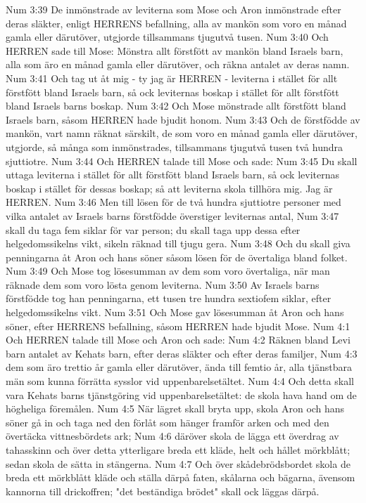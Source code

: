 Num 3:39  De inmönstrade av leviterna som Mose och Aron inmönstrade efter deras släkter, enligt HERRENS befallning, alla av mankön som voro en månad gamla eller därutöver, utgjorde tillsammans tjugutvå tusen.
Num 3:40  Och HERREN sade till Mose: Mönstra allt förstfött av mankön bland Israels barn, alla som äro en månad gamla eller därutöver, och räkna antalet av deras namn.
Num 3:41  Och tag ut åt mig - ty jag är HERREN - leviterna i stället för allt förstfött bland Israels barn, så ock leviternas boskap i stället för allt förstfött bland Israels barns boskap.
Num 3:42  Och Mose mönstrade allt förstfött bland Israels barn, såsom HERREN hade bjudit honom.
Num 3:43  Och de förstfödde av mankön, vart namn räknat särskilt, de som voro en månad gamla eller därutöver, utgjorde, så många som inmönstrades, tillsammans tjugutvå tusen två hundra sjuttiotre.
Num 3:44  Och HERREN talade till Mose och sade:
Num 3:45  Du skall uttaga leviterna i stället för allt förstfött bland Israels barn, så ock leviternas boskap i stället för dessas boskap; så att leviterna skola tillhöra mig. Jag är HERREN.
Num 3:46  Men till lösen för de två hundra sjuttiotre personer med vilka antalet av Israels barns förstfödde överstiger leviternas antal,
Num 3:47  skall du taga fem siklar för var person; du skall taga upp dessa efter helgedomssikelns vikt, sikeln räknad till tjugu gera.
Num 3:48  Och du skall giva penningarna åt Aron och hans söner såsom lösen för de övertaliga bland folket.
Num 3:49  Och Mose tog lösesumman av dem som voro övertaliga, när man räknade dem som voro lösta genom leviterna.
Num 3:50  Av Israels barns förstfödde tog han penningarna, ett tusen tre hundra sextiofem siklar, efter helgedomssikelns vikt.
Num 3:51  Och Mose gav lösesumman åt Aron och hans söner, efter HERRENS befallning, såsom HERREN hade bjudit Mose.
Num 4:1  Och HERREN talade till Mose och Aron och sade:
Num 4:2  Räknen bland Levi barn antalet av Kehats barn, efter deras släkter och efter deras familjer,
Num 4:3  dem som äro trettio år gamla eller därutöver, ända till femtio år, alla tjänstbara män som kunna förrätta sysslor vid uppenbarelsetältet.
Num 4:4  Och detta skall vara Kehats barns tjänstgöring vid uppenbarelsetältet: de skola hava hand om de högheliga föremålen.
Num 4:5  När lägret skall bryta upp, skola Aron och hans söner gå in och taga ned den förlåt som hänger framför arken och med den övertäcka vittnesbördets ark;
Num 4:6  däröver skola de lägga ett överdrag av tahasskinn och över detta ytterligare breda ett kläde, helt och hållet mörkblått; sedan skola de sätta in stängerna.
Num 4:7  Och över skådebrödsbordet skola de breda ett mörkblått kläde och ställa därpå faten, skålarna och bägarna, ävensom kannorna till drickoffren; "det beständiga brödet" skall ock läggas därpå.
